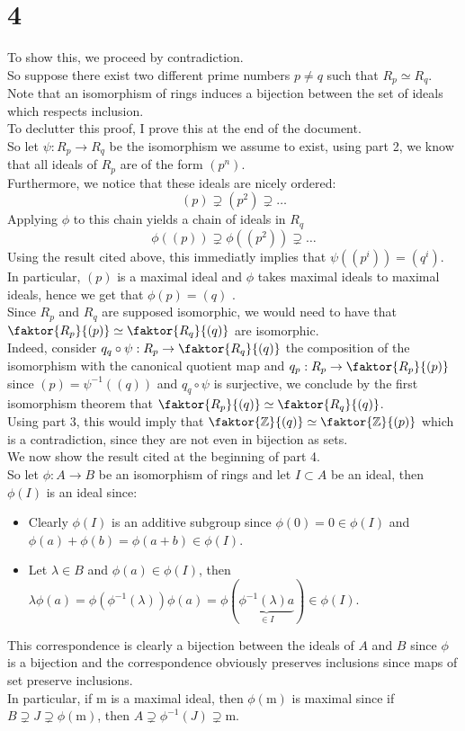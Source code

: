 \documentclass[11pt, a4paper]{article}
\begin{document}
\section*{4}
To show this, we proceed by contradiction.\\
So suppose there exist two different prime numbers $p\neq q$ such that $R_p\simeq R_q$.\\
Note that an isomorphism of rings induces a bijection between the set of ideals which respects inclusion.\\
To declutter this proof, I prove this at the end of the document.\\
So let $\psi: R_p\to R_q$ be the isomorphism we assume to exist, using part 2, we know that all ideals of $R_p$ are of the form $( p^{n}) $.\\
Furthermore, we notice that these ideals are nicely ordered:
\[ 
	( p) \supsetneq ( p^{2}) \supsetneq \ldots 
\]
Applying $\phi$ to this chain yields a chain of ideals in $ R_q$ 
\[ 
	\phi( ( p )) \supsetneq \phi( (  p^{2} )) \supsetneq \ldots
\]
Using the result cited above, this immediatly implies that $\psi( ( p^{i}) ) = ( q^{i})  $.\\
In particular, $ ( p) $ is a maximal ideal and $\phi$ takes maximal ideals to maximal ideals, hence we get that $\phi( p) = ( q) $ .\\
Since $R_p$ and $R_q$ are supposed isomorphic, we would need to have that $ \faktor { R_p} { ( p) } \simeq \faktor { R_q} { ( q) } $ are isomorphic.\\
Indeed, consider $q_q\circ\psi: R_p\to \faktor{R_q}{( q) }$ the composition of the isomorphism with the canonical quotient map and $q_p: R_p \to \faktor{R_p}{( p) }$ since $( p) = \psi^{-1}( ( q) ) $ and $q_q\circ\psi$ is surjective, we conclude by the first isomorphism theorem that $\faktor { R_p}{( q) } \simeq \faktor { R_q} { ( q) }  $.\\
Using part 3, this would imply that $ \faktor { \mathbb{Z}} { ( q) }\simeq \faktor { \mathbb{Z}} { ( p) } $ which is a contradiction, since they are not even in bijection as sets.\\

We now show the result cited at the beginning of part 4.\\
So let $ \phi: A \to B $ be an isomorphism of rings and let $I \subset A$ be an ideal, then $\phi( I) $ is an ideal since:
\begin{itemize}
\item Clearly $\phi( I) $ is an additive subgroup since $\phi( 0) = 0 \in \phi( I) $ and $\phi( a) + \phi( b) = \phi( a+b) \in\phi( I) $.
\item Let $\lambda\in B$ and $\phi( a) \in \phi( I) $, then $ \lambda\phi( a) = \phi( \phi^{-1}( \lambda) ) \phi( a) = \phi( \underbrace{\phi^{-1}( \lambda) a}_{\in I	})\in \phi( I)$. 
\end{itemize}
This correspondence is clearly a bijection between the ideals of $A$ and $B$ since $\phi$ is a bijection and the correspondence obviously preserves inclusions since maps of set preserve inclusions.\\
In particular, if $\mathrm{m} $ is a maximal ideal, then $\phi( \mathrm{m} ) $ is maximal since if $B \supsetneq J \supsetneq \phi( \mathrm{m}) $, then $A \supsetneq\phi^{-1}( J) \supsetneq \mathrm{m}$.
\end{document}
